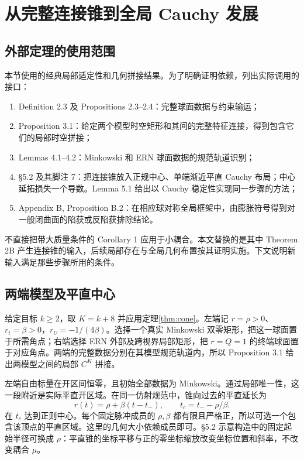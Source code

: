 \section{从完整连接锥到全局 Cauchy 发展}\label{sec:global}
\subsection{外部定理的使用范围}
本节使用\cite{KU}的经典局部适定性和几何拼接结果。为了明确证明依赖，列出实际调用的接口：
\begin{enumerate}
\item Definition 2.3 及 Propositions 2.3--2.4：完整球面数据与约束输运；
\item Proposition 3.1：给定两个模型时空矩形和其间的完整特征连接，得到包含它们的局部时空拼接；
\item Lemmas 4.1--4.2：Minkowski 和 ERN 球面数据的规范轨道识别；
\item §5.2 及其脚注 7：把连接锥放入正规中心、单端渐近平直 Cauchy 布局；中心延拓损失一个导数。Lemma 5.1 给出以 Cauchy 稳定性实现同一步骤的方法；
\item Appendix B, Proposition B.2：在相应球对称全局框架中，由膨胀符号得到对一般闭曲面的陷获或反陷获排除结论。
\end{enumerate}
不直接把带大质量条件的 Corollary 1 应用于小耦合。本文替换的是其中 Theorem 2B 产生连接锥的输入，后续局部存在与全局几何布置按其证明实施。下文说明新输入满足那些步骤所用的条件。

\subsection{两端模型及平直中心}
给定目标 $k\ge2$，取 $K=k+8$ 并应用定理\ref{thm:cone}。左端记 $r=\rho>0$、$r_t=\beta>0$，$r_U=-1/(4\beta)$。选择一个真实 Minkowski 双零矩形，把这一球面置于所需角点；右端选择 ERN 外部及跨视界局部矩形，把 $r=Q=1$ 的终端球面置于对应角点。两端的完整数据分别在其模型规范轨道内，所以 Proposition 3.1 给出两模型之间的局部 $C^K$ 拼接。

左端自由标量在开区间恒零，且初始全部数据为 Minkowski。通过局部唯一性，这一段附近是实际平直开区域。在同一仿射规范中，锥向过去的平直延长为
\begin{equation}\label{eq:centerextension}
r(t)=\rho+\beta(t-t_-),\qquad
t_c=t_- -\rho/\beta.
\end{equation}
在 $t_c$ 达到正则中心。每个固定脉冲成员的 $\rho,\beta$ 都有限且严格正，所以可选一个包含该顶点的平直区域。这里的几何大小依赖成员即可。§5.2 示意构造中的固定起始半径可换成 $\rho$：平直锥的坐标平移与正的零坐标缩放改变坐标位置和斜率，不改变耦合 $\mu$。

